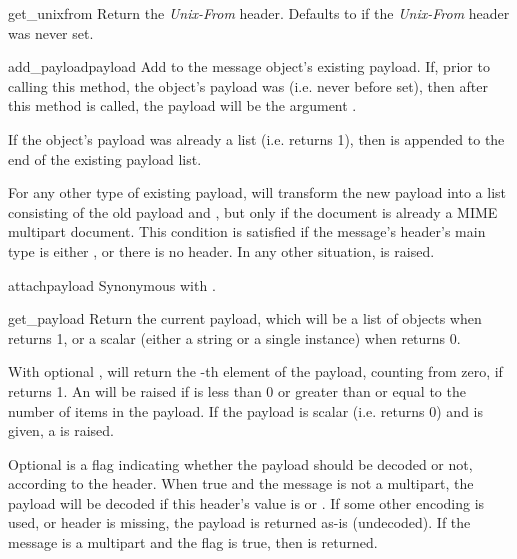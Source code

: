 \begin{methoddesc}[Message]{get_unixfrom}{}
Return the \emph{Unix-From} header.  Defaults to  if the
\emph{Unix-From} header was never set.
\end{methoddesc}

\begin{methoddesc}[Message]{add_payload}{payload}
Add  to the message object's existing payload.  If, prior
to calling this method, the object's payload was 
(i.e. never before set), then after this method is called, the payload
will be the argument .

If the object's payload was already a list
(i.e.  returns 1), then  is
appended to the end of the existing payload list.

For any other type of existing payload,  will
transform the new payload into a list consisting of the old payload
and , but only if the document is already a MIME
multipart document.  This condition is satisfied if the message's
 header's main type is either , or
there is no  header.  In any other situation,
 is raised.
\end{methoddesc}

\begin{methoddesc}[Message]{attach}{payload}
Synonymous with .
\end{methoddesc}

\begin{methoddesc}[Message]{get_payload}{}
Return the current payload, which will be a list of 
objects when  returns 1, or a scalar (either a
string or a single  instance) when
 returns 0.

With optional ,  will return the
-th element of the payload, counting from zero, if
 returns 1.  An  will be raised
if  is less than 0 or greater than or equal to the number of
items in the payload.  If the payload is scalar
(i.e.  returns 0) and  is given, a
 is raised.

Optional  is a flag indicating whether the payload should be
decoded or not, according to the  header.
When true and the message is not a multipart, the payload will be
decoded if this header's value is  or
.  If some other encoding is used, or
 header is
missing, the payload is returned as-is (undecoded).  If the message is
a multipart and the  flag is true, then  is
returned.
\end{methoddesc}

